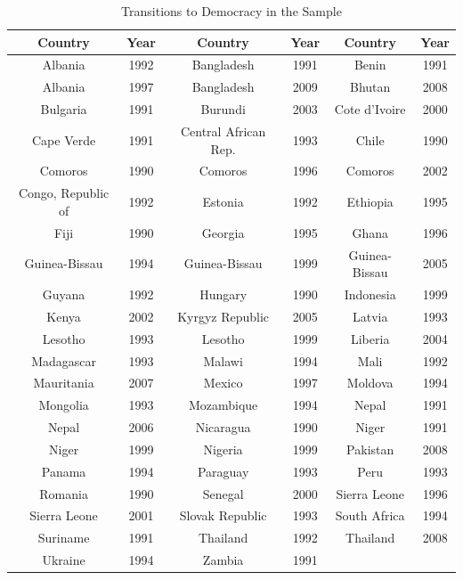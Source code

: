 \begin{appendix}
\begin{table}[h!]
    \caption{Transitions to Democracy in the Sample}\label{demo}
\centering
\begin{tabular}{c c c c c c}
\hline
Country & Year & Country & Year & Country & Year \\
\hline
Albania & 1992 & Bangladesh & 1991 & Benin & 1991 \\
Albania & 1997 & Bangladesh & 2009 & Bhutan & 2008 \\
Bulgaria & 1991 & Burundi & 2003 & Cote d'Ivoire & 2000 \\
Cape Verde & 1991 & Central African Rep. & 1993 & Chile & 1990 \\
Comoros & 1990 & Comoros & 1996 & Comoros & 2002 \\
Congo, Republic of & 1992 & Estonia & 1992 & Ethiopia & 1995 \\
Fiji & 1990 & Georgia & 1995 & Ghana & 1996 \\
Guinea-Bissau & 1994 & Guinea-Bissau & 1999 & Guinea-Bissau & 2005 \\
Guyana & 1992 & Hungary & 1990 & Indonesia & 1999 \\
Kenya & 2002 & Kyrgyz Republic & 2005 & Latvia & 1993 \\
Lesotho & 1993 & Lesotho & 1999 & Liberia & 2004 \\
Madagascar & 1993 & Malawi & 1994 & Mali & 1992 \\
Mauritania & 2007 & Mexico & 1997 & Moldova & 1994 \\
Mongolia & 1993 & Mozambique & 1994 & Nepal & 1991 \\
Nepal & 2006 & Nicaragua & 1990 & Niger & 1991 \\
Niger & 1999 & Nigeria & 1999 & Pakistan & 2008 \\
Panama & 1994 & Paraguay & 1993 & Peru & 1993 \\
Romania & 1990 & Senegal & 2000 & Sierra Leone & 1996 \\
Sierra Leone & 2001 & Slovak Republic & 1993 & South Africa & 1994 \\
Suriname & 1991 & Thailand & 1992 & Thailand & 2008 \\
Ukraine & 1994 & Zambia & 1991 & & \\
\hline
\end{tabular}
\end{table}



\end{appendix}
